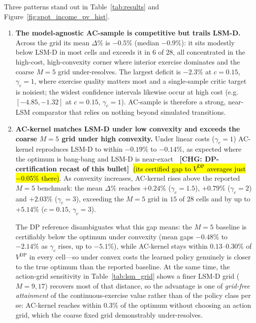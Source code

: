 \documentclass[a4paper,fleqn]{cas-dc}
\newcommand{\hlt}[1]{\hl{#1}}
\newcommand{\hlblock}[1]{\par\noindent
    \colorbox{chgyellow}{\parbox{\dimexpr\linewidth-2\fboxsep\relax}{#1}}\par}
\newcommand{\hlt}[1]{#1}
\newcommand{\hlblock}[1]{#1}
\newcommand{\chg}[1]{{\normalfont\bfseries\color{red}~[CHG: \textsf{\footnotesize #1}]~}}
\newcommand{\chg}[1]{}
\begin{document}
Three patterns stand out in Table~\ref{tab:results} and Figure~\ref{fig:spot_income_pv_hist}.
\begin{enumerate}
    \item \textbf{The model-agnostic AC-sample is competitive but trails LSM-D.} Across the grid its mean $\Delta\%$ is $-0.5\%$ (median $-0.9\%$): it sits modestly below LSM-D in most cells and exceeds it in $6$ of $28$, all concentrated in the high-cost, high-convexity corner where interior exercise dominates and the coarse $M=5$ grid under-resolves. The largest deficit is $-2.3\%$ at $c=0.15$, $\gamma_c=1$, where exercise quality matters most and a single-sample critic target is noisiest; the widest confidence intervals likewise occur at high cost (e.g.\ $[-4.85,-1.32]$ at $c=0.15$, $\gamma_c=1$). AC-sample is therefore a strong, near-LSM comparator that relies on nothing beyond simulated transitions.
    \item \textbf{AC-kernel matches LSM-D under low convexity and exceeds the coarse $M=5$ grid under high convexity.} Under linear costs ($\gamma_c=1$) AC-kernel reproduces LSM-D to within $-0.19\%$ to $-0.14\%$, as expected where the optimum is bang-bang and LSM-D is near-exact \chg{DP-certification recast of this bullet}\hlt{(its certified gap to \mbox{$V^{\mathrm{DP}}$} averages just \mbox{$-0.05\%$} there)}. As convexity increases, AC-kernel rises above the reported $M=5$ benchmark: the mean $\Delta\%$ reaches $+0.24\%$ ($\gamma_c=1.5$), $+0.79\%$ ($\gamma_c=2$) and $+2.03\%$ ($\gamma_c=3$), exceeding the $M=5$ grid in $15$ of $28$ cells and by up to $+5.14\%$ ($c=0.15$, $\gamma_c=3$).
    \hlblock{The DP reference disambiguates what this gap means: the $M=5$ baseline is certifiably below the optimum under convexity (mean gaps $-0.48\%$ to $-2.14\%$ as $\gamma_c$ rises, up to $-5.1\%$), while AC-kernel stays within $0.13$--$0.30\%$ of $V^{\mathrm{DP}}$ in every cell---so under convex costs the learned policy genuinely is closer to the true optimum than the reported baseline. At the same time, the action-grid sensitivity in Table~\ref{tab:lsm_grid} shows a finer LSM-D grid ($M=9,17$) recovers most of that distance, so the advantage is one of \emph{grid-free attainment} of the continuous-exercise value rather than of the policy class per se: AC-kernel reaches within $0.3\%$ of the optimum without choosing an action grid, which the coarse fixed grid demonstrably under-resolves.}

\end{enumerate}
\end{document}
